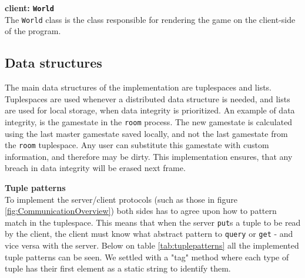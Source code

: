 \textbf{client: \texttt{World}}\\
The \texttt{World} class is the class responsible for rendering the game on the client-side of the program. 



\subsection{Data structures}
The main data structures of the implementation are tuplespaces and lists. Tuplespaces are used whenever a distributed data structure is needed, and lists are used for local storage, when data integrity is prioritized. An example of data integrity, is the gamestate in the \texttt{room} process. The new gamestate is calculated using the last master gamestate saved locally, and not the last gamestate from the \texttt{room} tuplespace. Any user can substitute this gamestate with custom information, and therefore may be dirty. This implementation ensures, that any breach in data integrity will be erased next frame. 

\textbf{Tuple patterns}\\
To implement the server/client protocols (such as those in figure \ref{fig:CommunicationOverview}) both sides has to agree upon how to pattern match in the tuplespace. This means that when the server \texttt{put}s a tuple to be read by the client, the client must know what abstract pattern to \texttt{query} or \texttt{get} - and vice versa with the server. Below on table \ref{tab:tuplepatterns} all the implemented tuple patterns can be seen. We settled with a "tag" method where each type of tuple has their first element as a static string to identify them. 

